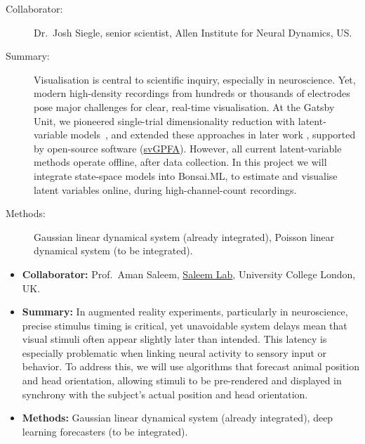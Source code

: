\begin{description}

    \item[Collaborator:] Dr.~Josh Siegle, senior scientist, Allen Institute for
Neural Dynamics, US.

    \item[Summary:]

        Visualisation is central to scientific inquiry, especially in
        neuroscience. Yet, modern high-density recordings from hundreds or
        thousands of electrodes pose major challenges for clear, real-time
        visualisation. At the Gatsby Unit, we pioneered single-trial
        dimensionality reduction with latent-variable models~\citep{yuEtAl09},
        and extended these approaches in later work
        \citep[e.g.,][]{dunckerAndSahani18}, supported by open-source software
        (\href{https://github.com/joacorapela/svGPFA}{svGPFA}).  However, all
        current latent-variable methods operate offline, after data collection.
        In this project we will integrate state-space models into Bonsai.ML, to
        estimate and visualise latent variables online, during
        high-channel-count recordings.

    \item[Methods:] Gaussian linear dynamical system (already integrated),
Poisson linear dynamical system (to be integrated).

\end{description}


\begin{itemize}

    \item\textbf{Collaborator:} Prof.~Aman Saleem,
        \href{https://www.saleemlab.com/}{Saleem Lab}, University College London,
        UK.

    \item\textbf{Summary:} In augmented reality experiments, particularly in
        neuroscience, precise stimulus timing is critical, yet unavoidable
        system delays mean that visual stimuli often appear slightly later than
        intended. This latency is especially problematic when linking neural
        activity to sensory input or behavior. To address this, we will use
        algorithms that forecast animal position and head orientation, allowing
        stimuli to be pre-rendered and displayed in synchrony with the
        subject’s actual position and head orientation.

    \item\textbf{Methods:} Gaussian linear dynamical system (already integrated),
deep learning forecasters (to be integrated).

\end{itemize}


